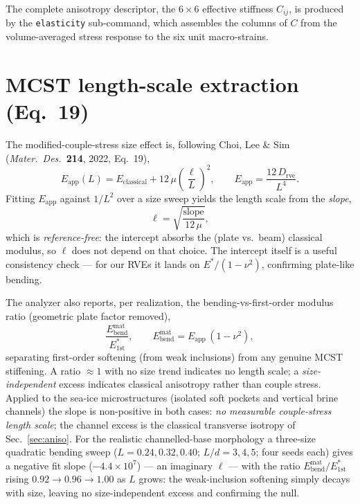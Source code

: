 \documentclass[11pt]{article}
\newcommand{\code}[1]{\texttt{\small #1}}
\begin{document}
The complete anisotropy descriptor, the $6\times6$ effective stiffness
$C_{ij}$, is produced by the \code{elasticity} sub-command, which assembles the
columns of $C$ from the volume-averaged stress response to the six unit
macro-strains.

\section{MCST length-scale extraction (Eq.~19)}
\label{sec:eq19}
The modified-couple-stress size effect is, following Choi, Lee \& Sim
(\textit{Mater.\ Des.}\ \textbf{214}, 2022, Eq.~19),
\begin{equation}
  E_\text{app}(L)=E_\text{classical}+12\,\mu\left(\frac{\ell}{L}\right)^{2},
  \qquad E_\text{app}=\frac{12\,D_\text{rve}}{L^{4}} .
  \label{eq:eq19}
\end{equation}
Fitting $E_\text{app}$ against $1/L^2$ over a size sweep yields the length scale
from the \emph{slope},
\begin{equation}
  \ell=\sqrt{\frac{\text{slope}}{12\,\mu}},
\end{equation}
which is \emph{reference-free}: the intercept absorbs the (plate vs.\ beam)
classical modulus, so $\ell$ does not depend on that choice. The intercept itself
is a useful consistency check --- for our RVEs it lands on $E^\ast/(1-\nu^2)$,
confirming plate-like bending.

The analyzer also reports, per realization, the bending-vs-first-order modulus
ratio (geometric plate factor removed),
\begin{equation}
  \frac{E_\text{bend}^\text{mat}}{E^\ast_\text{1st}},
  \qquad E_\text{bend}^\text{mat}=E_\text{app}\,(1-\nu^2),
\end{equation}
separating first-order softening (from weak inclusions) from any genuine MCST
stiffening. A ratio $\approx 1$ with no size trend indicates no length scale;
a \emph{size-independent} excess indicates classical anisotropy rather than
couple stress. Applied to the sea-ice microstructures (isolated soft pockets and
vertical brine channels) the slope is non-positive in both cases: \emph{no
measurable couple-stress length scale}; the channel excess is the classical
transverse isotropy of Sec.~\ref{sec:aniso}. For the realistic channelled-base
morphology a three-size quadratic bending sweep ($L=0.24,0.32,0.40$; $L/d=3,4,5$;
four seeds each) gives a negative fit slope ($-4.4\times10^{7}$) --- an imaginary
$\ell$ --- with the ratio $E_\text{bend}^\text{mat}/E^\ast_\text{1st}$ rising
$0.92\!\to\!0.96\!\to\!1.00$ as $L$ grows: the weak-inclusion softening simply
decays with size, leaving no size-independent excess and confirming the null.
\end{document}
